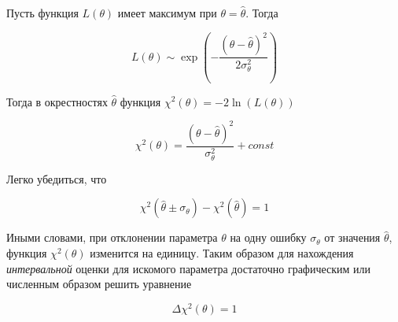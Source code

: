 \documentclass[12pt]{article}
\begin{document}
      Пусть функция $L(\theta)$ имеет максимум при $\theta = \hat{\theta}$.
      Тогда

      $$
        L(\theta) \sim \exp \left({-\frac{(\theta - \hat{\theta})^2}{2 \sigma_{\theta}^2}}\right)
      $$

      Тогда в окрестностях $\hat{\theta}$ функция $\chi^2 (\theta) = -2 \ln({L(\theta)})$

      $$
        \chi^2 (\theta) = \frac{(\theta - \hat{\theta})^2}{\sigma_{\theta}^2} + const
      $$

      Легко убедиться, что

      $$
        \chi^2 (\hat{\theta} \pm \sigma_{\theta}) - \chi^2 (\hat{\theta}) = 1
      $$

      Иными словами, при отклонении параметра $\theta$ на одну ошибку $\sigma_{\theta}$
      от значения $\hat{\theta}$, функция $\chi^2 (\theta)$ изменится на единицу.
      Таким образом для нахождения \textit{интервальной} оценки для искомого параметра
      достаточно графическим или численным образом решить уравнение

      $$
        \Delta \chi^2 (\theta) = 1
      $$
\end{document}
